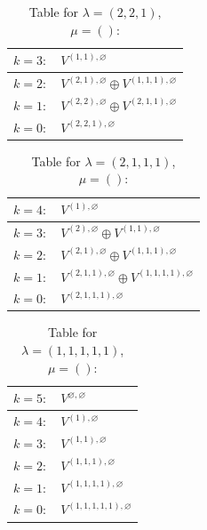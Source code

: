 \documentclass[a4paper,12pt]{article}
\begin{document}
\renewcommand{\arraystretch}{1.6} 
\begin{table}[H]
\centering
\caption{Table for $\lambda = (2, 2, 1)$, $\mu = ()$:}
\begin{tabular}{|>{\centering\arraybackslash}p{15cm}|}
\hline
 $k = 3: \quad V^{(1, 1), \varnothing} $ \\ \hline
 $k = 2: \quad V^{(2, 1), \varnothing} \oplus V^{(1, 1, 1), \varnothing} $ \\ \hline
 $k = 1: \quad V^{(2, 2), \varnothing} \oplus V^{(2, 1, 1), \varnothing} $ \\ \hline
 $k = 0: \quad V^{(2, 2, 1), \varnothing} $ \\ \hline
\end{tabular}
\end{table}

\renewcommand{\arraystretch}{1.6} 
\begin{table}[H]
\centering
\caption{Table for $\lambda = (2, 1, 1, 1)$, $\mu = ()$:}
\begin{tabular}{|>{\centering\arraybackslash}p{15cm}|}
\hline
 $k = 4: \quad V^{(1), \varnothing} $ \\ \hline
 $k = 3: \quad V^{(2), \varnothing} \oplus V^{(1, 1), \varnothing} $ \\ \hline
 $k = 2: \quad V^{(2, 1), \varnothing} \oplus V^{(1, 1, 1), \varnothing} $ \\ \hline
 $k = 1: \quad V^{(2, 1, 1), \varnothing} \oplus V^{(1, 1, 1, 1), \varnothing} $ \\ \hline
 $k = 0: \quad V^{(2, 1, 1, 1), \varnothing} $ \\ \hline
\end{tabular}
\end{table}

\renewcommand{\arraystretch}{1.6} 
\begin{table}[H]
\centering
\caption{Table for $\lambda = (1, 1, 1, 1, 1)$, $\mu = ()$:}
\begin{tabular}{|>{\centering\arraybackslash}p{15cm}|}
\hline
 $k = 5: \quad V^{\varnothing, \varnothing} $ \\ \hline
 $k = 4: \quad V^{(1), \varnothing} $ \\ \hline
 $k = 3: \quad V^{(1, 1), \varnothing} $ \\ \hline
 $k = 2: \quad V^{(1, 1, 1), \varnothing} $ \\ \hline
 $k = 1: \quad V^{(1, 1, 1, 1), \varnothing} $ \\ \hline
 $k = 0: \quad V^{(1, 1, 1, 1, 1), \varnothing} $ \\ \hline
\end{tabular}
\end{table}
\end{document}
